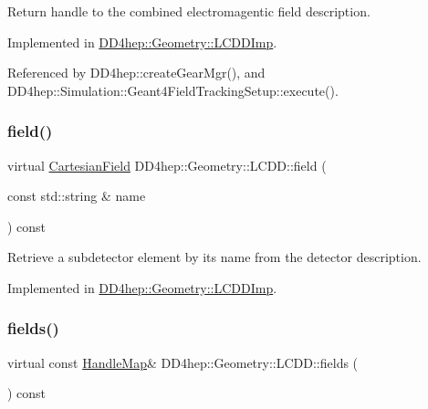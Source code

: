 Return handle to the combined electromagentic field description. 



Implemented in \hyperlink{class_d_d4hep_1_1_geometry_1_1_l_c_d_d_imp_aca6f9ec862a0dbf793d2d26afc34039b}{D\+D4hep\+::\+Geometry\+::\+L\+C\+D\+D\+Imp}.



Referenced by D\+D4hep\+::create\+Gear\+Mgr(), and D\+D4hep\+::\+Simulation\+::\+Geant4\+Field\+Tracking\+Setup\+::execute().

\hypertarget{class_d_d4hep_1_1_geometry_1_1_l_c_d_d_adcc7929860f5ac592d8f4c2d476555e9}{}\label{class_d_d4hep_1_1_geometry_1_1_l_c_d_d_adcc7929860f5ac592d8f4c2d476555e9} 
\subsubsection{\texorpdfstring{field()}{field()}\hspace{0.1cm}{\footnotesize\ttfamily [2/2]}}
{\footnotesize\ttfamily virtual \hyperlink{class_d_d4hep_1_1_geometry_1_1_cartesian_field}{Cartesian\+Field} D\+D4hep\+::\+Geometry\+::\+L\+C\+D\+D\+::field (\begin{DoxyParamCaption}\item[{const std\+::string \&}]{name }\end{DoxyParamCaption}) const\hspace{0.3cm}{\ttfamily [pure virtual]}}



Retrieve a subdetector element by it\textquotesingle{}s name from the detector description. 



Implemented in \hyperlink{class_d_d4hep_1_1_geometry_1_1_l_c_d_d_imp_ad80857a2febc6efe278c56e7ad1e25b8}{D\+D4hep\+::\+Geometry\+::\+L\+C\+D\+D\+Imp}.

\hypertarget{class_d_d4hep_1_1_geometry_1_1_l_c_d_d_af2622f438504300116fabfa214b23be5}{}\label{class_d_d4hep_1_1_geometry_1_1_l_c_d_d_af2622f438504300116fabfa214b23be5} 
\subsubsection{\texorpdfstring{fields()}{fields()}}
{\footnotesize\ttfamily virtual const \hyperlink{class_d_d4hep_1_1_geometry_1_1_l_c_d_d_a05cb11e7355772c7b0794bcca59bf477}{Handle\+Map}\& D\+D4hep\+::\+Geometry\+::\+L\+C\+D\+D\+::fields (\begin{DoxyParamCaption}{ }\end{DoxyParamCaption}) const\hspace{0.3cm}{\ttfamily [pure virtual]}}



